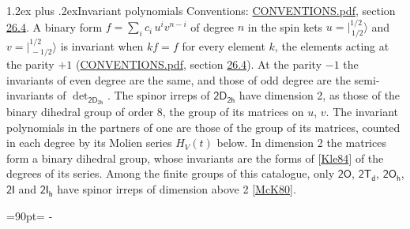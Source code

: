 \documentclass[10pt,a4paper]{article}
\makeatletter
\renewcommand\section{\@startsection{section}{1}{\z@}{-3ex plus -1ex minus -.2ex}%
  {1.2ex plus .2ex}{\normalfont\large\sffamily\bfseries\color{parttitle}}}
\newcommand{\needspace}[1]{\par\penalty-100\begingroup\dimen0=#1\relax\dimen2=\pagegoal
  \advance\dimen2-\pagetotal\ifdim\dimen0>\dimen2\relax\ifdim\dimen2>0pt\vfil\break\fi\fi
  \endgroup}
\numberwithin{equation}{section}
\newcommand{\grp}[1]{\mathsf{#1}}
\newcommand{\jm}[2]{\bigl\lvert{}^{#1}_{\,#2}\bigr\rangle}
\makeatother
\begin{document}
\section{Invariant polynomials}\label{s:invariants}
Conventions: \href{../../CONVENTIONS.pdf}{CONVENTIONS.pdf}, section \href{../../CONVENTIONS.pdf\#conv.26.4}{26.4}.
\leavevmode\label{n:local.binary.form}A binary form $f = \sum_i c_i\, u^i v^{n-i}$ of degree $n$ in the spin kets $u = \jm{1/2}{1/2}$ and $v = \jm{1/2}{-1/2}$ is invariant when $k f = f$ for every element $k$, the elements acting at the parity $+1$ (\href{../../CONVENTIONS.pdf}{CONVENTIONS.pdf}, section \href{../../CONVENTIONS.pdf\#conv.26.4}{26.4}). At the parity $-1$ the invariants of even degree are the same, and those of odd degree are the semi-invariants of $\det_{\grp{2D_{2h}}}$.
The spinor irreps of $\grp{2D_{2h}}$ have dimension 2, as those of the binary dihedral group of order 8, the group of its matrices on $u$, $v$. \label{n:function.hilbert}The invariant polynomials in the partners of one are those of the group of its matrices, counted in each degree by its Molien series $H_V(t)$ below. In dimension 2 the matrices form a binary dihedral group, whose invariants are the forms of [\href{../../../REFERENCES.pdf\#ref.Kle84}{Kle84}] of the degrees of its series. Among the finite groups of this catalogue, only $\grp{2O}$, $\grp{2T_{d}}$, $\grp{2O_{h}}$, $\grp{2I}$ and $\grp{2I_{h}}$ have spinor irreps of dimension above 2 [\href{../../../REFERENCES.pdf\#ref.McK80}{McK80}].
\needspace{90pt}
\end{document}
